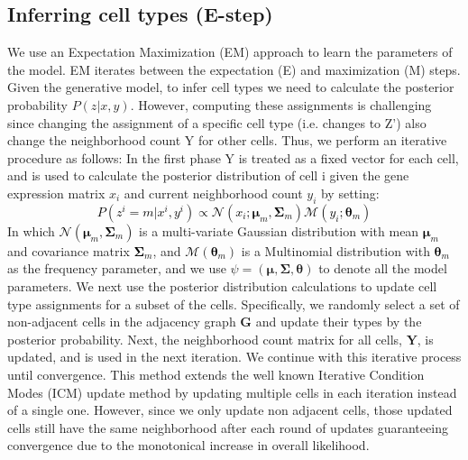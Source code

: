 \subsection{Inferring cell types (E-step)}
\label{expectation}
We use an Expectation Maximization (EM) approach to learn the parameters of the model. EM iterates between the expectation (E) and maximization (M) steps.
Given the generative model, to infer cell types we need to calculate the posterior probability $P(z|x,y)$. However, computing these assignments is challenging since changing the assignment of a specific cell type (i.e. changes to Z') also change the neighborhood count Y for other cells. Thus, we perform an iterative procedure as follows: In the first phase Y is treated as a fixed vector for each  cell, and is used to calculate the posterior distribution of cell i given the gene expression matrix $x_i$ and current neighborhood count $y_i$ by setting:
\textcolor{black}{
\begin{equation}
    P(z^{i}=m|x^{i},y^{i}) \propto \mathcal{N}(x_i;\boldsymbol{\mu}_m,\boldsymbol{\Sigma}_m) \mathcal{M}(y_i;\boldsymbol{\theta}_m)
\end{equation}}
In which \textcolor{black}{$\mathcal{N}(\boldsymbol{\mu}_m,\boldsymbol{\Sigma}_m)$} is a multi-variate Gaussian distribution with mean \textcolor{black}{$\boldsymbol{\mu}_m$} and covariance matrix \textcolor{black}{$\boldsymbol{\Sigma}_m$}, and \textcolor{black}{$\mathcal{M}(\boldsymbol{\theta}_m)$} is a Multinomial distribution with \textcolor{black}{$\boldsymbol{\theta}_m$} as the frequency parameter, and we use $\psi = (\boldsymbol{\mu},\boldsymbol{\Sigma},\boldsymbol{\theta})$ to denote all the model parameters. We next use the posterior distribution calculations to update cell type assignments for a subset of the cells. Specifically, we randomly select a set of non-adjacent cells in the adjacency graph $\boldsymbol{G}$ and update their types by the posterior probability. Next, the neighborhood count matrix for all cells, $\mathbf{Y}$, is updated, and is used in the next iteration. We continue with  this iterative process  until convergence. This method extends the well known Iterative Condition Modes (ICM) update method \cite{besag1986statistical} by updating multiple cells in each iteration instead of a single one. However, since we only update non adjacent cells, those updated cells still have the same neighborhood after each round of updates guaranteeing convergence due to the monotonical increase in overall likelihood.  

